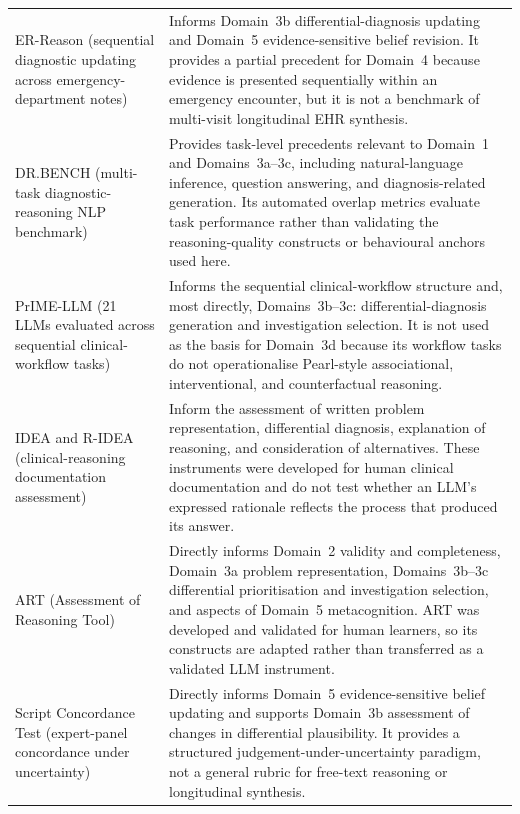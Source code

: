 \documentclass{article}
\begin{document}
{\begin{longtable}{p{}p{}}
ER-Reason
(sequential diagnostic updating across emergency-department notes)
\cite{mehandru2025}
&
Informs Domain~3b differential-diagnosis updating and Domain~5
evidence-sensitive belief revision. It provides a partial precedent
for Domain~4 because evidence is presented sequentially within an
emergency encounter, but it is not a benchmark of multi-visit
longitudinal EHR synthesis.
\\

DR.BENCH
(multi-task diagnostic-reasoning NLP benchmark)
\cite{gao2023drbench}
&
Provides task-level precedents relevant to Domain~1 and
Domains~3a--3c, including natural-language inference, question
answering, and diagnosis-related generation. Its automated overlap
metrics evaluate task performance rather than validating the
reasoning-quality constructs or behavioural anchors used here.
\\

PrIME-LLM
(21 LLMs evaluated across sequential clinical-workflow tasks)
\cite{rao2026clinicalreasoning}
&
Informs the sequential clinical-workflow structure and, most directly,
Domains~3b--3c: differential-diagnosis generation and investigation
selection. It is not used as the basis for Domain~3d because its
workflow tasks do not operationalise Pearl-style associational,
interventional, and counterfactual reasoning.
\\

IDEA and R-IDEA
(clinical-reasoning documentation assessment)
\cite{baker2015,schaye2022}
&
Inform the assessment of written problem representation, differential
diagnosis, explanation of reasoning, and consideration of alternatives.
These instruments were developed for human clinical documentation and
do not test whether an LLM's expressed rationale reflects the process
that produced its answer.
\\

ART
(Assessment of Reasoning Tool)
\cite{thammasitboon2018art,cook2021artvalidation}
&
Directly informs Domain~2 validity and completeness,
Domain~3a problem representation, Domains~3b--3c differential
prioritisation and investigation selection, and aspects of Domain~5
metacognition. ART was developed and validated for human learners, so
its constructs are adapted rather than transferred as a validated LLM
instrument.
\\

Script Concordance Test
(expert-panel concordance under uncertainty)
\cite{lubarsky2011sct,fournier2008sct,lubarsky2013}
&
Directly informs Domain~5 evidence-sensitive belief updating and
supports Domain~3b assessment of changes in differential plausibility.
It provides a structured judgement-under-uncertainty paradigm, not a
general rubric for free-text reasoning or longitudinal synthesis.
\\


\end{longtable}}
\end{document}
